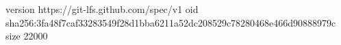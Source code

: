 version https://git-lfs.github.com/spec/v1
oid sha256:3fa48f7caf33283549f28d1bba6211a52dc208529c78280468e466d90888979c
size 22000
